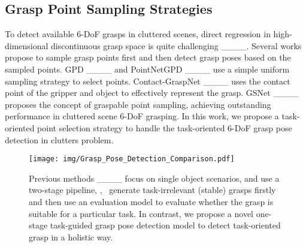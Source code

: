 \subsection{Grasp Point Sampling Strategies}
To detect available 6-DoF grasps in cluttered scenes, direct regression in high-dimensional discontinuous grasp space is quite challenging ____. 
Several works propose to sample grasp points first and then detect grasp poses based on the sampled points. 
GPD ____ and PointNetGPD ____ use a simple uniform sampling strategy to select points. 
Contact-GraspNet ____ uses the contact point of the gripper and object to effectively represent the grasp.
GSNet ____ proposes the concept of graspable point sampling, achieving outstanding performance in cluttered scene 6-DoF grasping. 
In this work, we propose a task-oriented point selection strategy to handle the task-oriented 6-DoF grasp pose detection in clutters problem. 
\begin{figure}[t]
    \centering
    \vspace{0.2cm}
    \texttt{[image: img/Grasp\_Pose\_Detection\_Comparison.pdf]}
    \caption{Previous methods ____ focus on single object scenarios, and use a two-stage pipeline, \ie,~ generate task-irrelevant (stable) grasps firstly and then use an evaluation model to evaluate whether the grasp is suitable for a particular task. 
    In contrast, we propose a novel one-stage task-guided grasp pose detection model to detect task-oriented grasp in a holistic way.}
    \label{fig:grasp_pose_generation_comparison}
    \vspace{-0.2cm}
\end{figure}